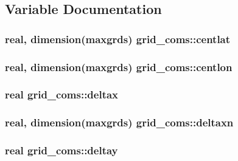 \subsection{Variable Documentation}
\hypertarget{namespacegrid__coms_a88baeaebc7ead79b3b400cfa34392384}{}
\subsubsection[{centlat}]{\setlength{\rightskip}{0pt plus 5cm}real, dimension(maxgrds) grid\+\_\+coms\+::centlat}\label{namespacegrid__coms_a88baeaebc7ead79b3b400cfa34392384}
\hypertarget{namespacegrid__coms_a249d1ce34222c741969c77af125d21ba}{}
\subsubsection[{centlon}]{\setlength{\rightskip}{0pt plus 5cm}real, dimension(maxgrds) grid\+\_\+coms\+::centlon}\label{namespacegrid__coms_a249d1ce34222c741969c77af125d21ba}
\hypertarget{namespacegrid__coms_aefac306f17fd9da10ae08206490c1d96}{}
\subsubsection[{deltax}]{\setlength{\rightskip}{0pt plus 5cm}real grid\+\_\+coms\+::deltax}\label{namespacegrid__coms_aefac306f17fd9da10ae08206490c1d96}
\hypertarget{namespacegrid__coms_a6adc70cd69fe9f3ba2d1f5c8ebb9ab74}{}
\subsubsection[{deltaxn}]{\setlength{\rightskip}{0pt plus 5cm}real, dimension(maxgrds) grid\+\_\+coms\+::deltaxn}\label{namespacegrid__coms_a6adc70cd69fe9f3ba2d1f5c8ebb9ab74}
\hypertarget{namespacegrid__coms_a80d44caaab6b380ba782f2e41e9c00a8}{}
\subsubsection[{deltay}]{\setlength{\rightskip}{0pt plus 5cm}real grid\+\_\+coms\+::deltay}\label{namespacegrid__coms_a80d44caaab6b380ba782f2e41e9c00a8}
\hypertarget{namespacegrid__coms_a9223404a2c92ad4c68494e9200f2d604}{}
